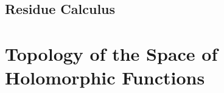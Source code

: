 \documentclass{article}
\begin{document}







\subsection{Residue Calculus}

\section{Topology of the Space of Holomorphic Functions}
\end{document}
